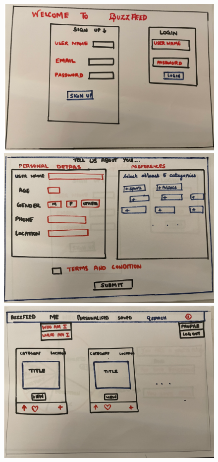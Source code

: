 \begin{enumerate}
   \begin{figure}[h!]
    \begin{multicols}{2}
    \includegraphics[width=\linewidth]{images/signup.png}\par 
    \includegraphics[width=\linewidth]{images/userdetails-signup.png}\par 
    \end{multicols}
\begin{multicols}{2}
    \includegraphics[width=\linewidth]{images/personalfeed.png}\par

\end{multicols}
\end{figure}
\end{enumerate}
